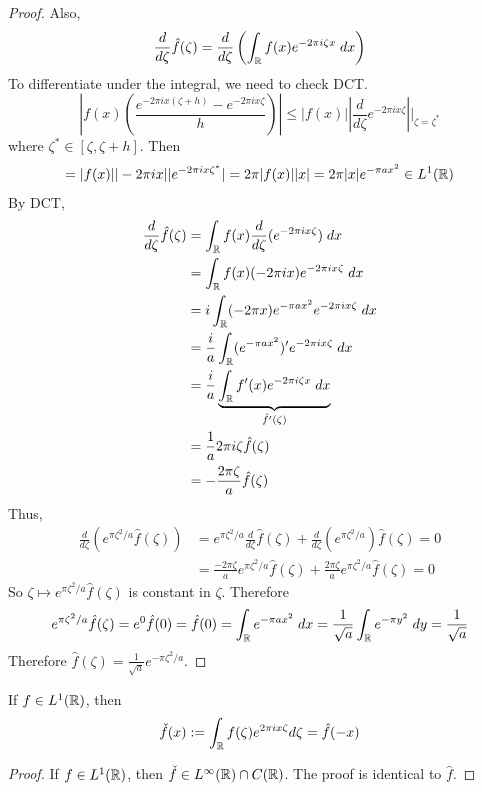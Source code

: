 \begin{proof}
    Also, 
    \[
        \frac{d}{d\zeta} \hat{f}(\zeta) = \frac{d}{d \zeta} \left( \int_{\mathbb{R}} f(x) e^{-2 \pi i \zeta x} \; dx \right)
    \] 
    To differentiate under the integral, we need to check DCT.
    \[
        \left| f(x) \left( \frac{e^{-2 \pi i x (\zeta + h)} - e^{-2 \pi i x \zeta}}{h} \right) \right| \leq |f(x)| \left| \frac{d}{d \zeta} e^{-2 \pi i x \zeta} \right| \Big|_{\zeta = \zeta^*} 
    \] 
    where $\zeta^* \in [\zeta, \zeta + h]$. Then
    \begin{align*}
        = |f(x)| |-2 \pi i x| |e^{-2 \pi i x \zeta^*}| = 2 \pi |f(x)| |x| = 2 \pi |x| e^{-\pi a x^2} \in L^1(\mathbb{R})
    \end{align*}
    By DCT, 
    \begin{align*}
        \frac{d}{d \zeta} \hat{f}(\zeta) &= \int_{\mathbb{R}} f(x) \frac{d}{d \zeta}(e^{-2 \pi i x \zeta}) \; dx \\
        &= \int_{\mathbb{R}} f(x) (-2 \pi i x) e^{-2 \pi i x \zeta} \; dx \\
        &= i \int_{\mathbb{R}} (-2 \pi x) e^{-\pi a x^2} e^{-2 \pi i x \zeta} \; dx \\
        &= \frac{i}{a} \int_{\mathbb{R}} (e^{-\pi a x^2})' e^{-2 \pi i x \zeta} \; dx \\
        &= \frac{i}{a} \underbrace{\int_{\mathbb{R}} f'(x) e^{-2 \pi i \zeta x} \; dx}_{\hat{f'}(\zeta)} \\
        &= \frac{1}{a} 2 \pi i \zeta \hat{f}(\zeta) \\
        &= -\frac{2 \pi \zeta}{a} \hat{f}(\zeta)
    \end{align*}
    Thus,
    \begin{align*}
        \frac{d}{d \zeta} (e^{\pi \zeta^2 / a} \hat{f}(\zeta)) &= e^{\pi \zeta^2 / a} \frac{d}{d \zeta} \hat{f}(\zeta) + \frac{d}{d \zeta}(e^{\pi \zeta^2 / a}) \hat{f}(\zeta) = 0 \\
        &= \frac{-2 \pi \zeta}{a} e^{\pi \zeta^2 / a} \hat{f}(\zeta) + \frac{2 \pi \zeta}{a} e^{\pi \zeta^2/a} \hat{f}(\zeta) = 0
    \end{align*}
    So $\zeta \mapsto e^{\pi \zeta^2 / a} \hat{f}(\zeta)$ is constant in $\zeta$. Therefore
    \[
        e^{\pi \zeta^2/a} \hat{f}(\zeta) = e^{0} \hat{f}(0) = \hat{f}(0) = \int_{\mathbb{R}} e^{-\pi a x^2} \; dx = \frac{1}{\sqrt{a}} \int_{\mathbb{R}} e^{-\pi y^2} \; dy = \frac{1}{\sqrt{a}}
    \]  
    Therefore $\hat{f}(\zeta) = \frac{1}{\sqrt{a}} e^{-\pi \zeta^2 / a}$. \qedhere 
\end{proof}

\begin{defn}
    If $f \in L^1(\mathbb{R})$, then 
    \[
        \check{f}(x) := \int_{\mathbb{R}} f(\zeta) e^{2 \pi i x \zeta} d \zeta = \hat{f}(-x)
    \] 
\end{defn}
\begin{proof}
    If $f \in L^1(\mathbb{R})$, then $\check{f} \in L^\infty(\mathbb{R}) \cap C(\mathbb{R})$. The proof is identical to $\hat{f}$.   
\end{proof}

